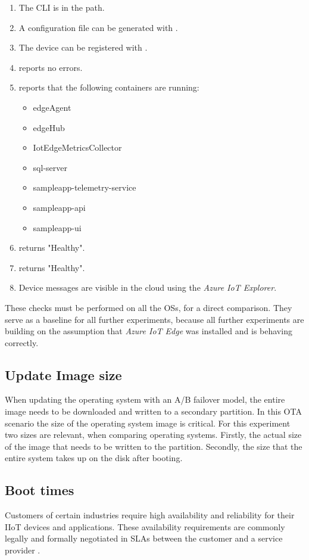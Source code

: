 \begin{enumerate}
    \item The  \ac{CLI} is in the path.
    \item A configuration file can be generated with .
    \item The device can be registered with .
    \item {} reports no errors.
    \item {} reports that the following containers
    are running:
    \begin{itemize}
        \item edgeAgent
        \item edgeHub
        \item IotEdgeMetricsCollector
        \item sql-server
        \item sampleapp-telemetry-service
        \item sampleapp-api
        \item sampleapp-ui
    \end{itemize}
    \item {} returns "Healthy".
    \item {} returns "Healthy".
    \item Device messages are visible in the cloud using the \textit{Azure IoT Explorer}.
\end{enumerate}
These checks must be performed on all the \ac{OS}s, for a direct comparison.
They serve as a baseline for all further experiments, because all further
experiments are building on the assumption that \textit{Azure IoT Edge} was
installed and is behaving correctly.

\subsection{Update Image size}
\label{sec:update-image}
When updating the operating system with an A/B failover model, the entire
image needs to be downloaded and written to a secondary partition. In this
\ac{OTA} scenario the size of the operating system image is critical.
For this experiment two sizes are relevant, when comparing operating systems.
Firstly, the actual size of the image that needs to be written to the partition.
Secondly, the size that the entire system takes up on the disk after booting.

\subsection{Boot times}
Customers of certain industries require high availability and reliability for
their \ac{IIoT} devices and applications. These availability requirements
are commonly legally and formally negotiated in \ac{SLA}s between
the customer and a service provider \cite{msdoc-slas}.

